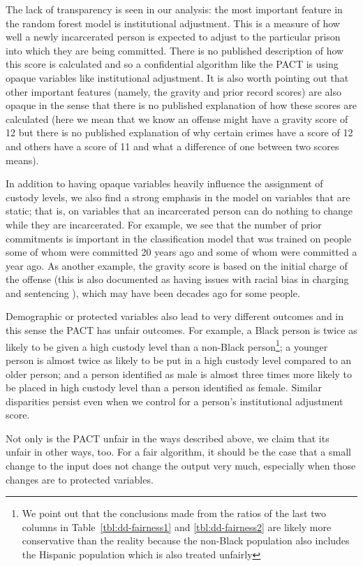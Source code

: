 \documentclass{amsproc}
\numberwithin{equation}{section}
\theoremstyle{plain}
\theoremstyle{remark}
\begin{document}
The lack of transparency is seen in our analysis:  the most important feature in the random forest model is institutional adjustment.  This is a measure of how well a newly incarcerated person is expected to adjust to the particular prison into which they are being committed.  There is no published description of how this score is calculated and so a confidential algorithm like the PACT is using opaque variables like institutional adjustment.  It is also worth pointing out that other important features (namely, the gravity and prior record scores) are also opaque in the sense that there is no published explanation of how these scores are calculated (here we mean that we know an offense might have a gravity score of 12 but there is no published explanation of why certain crimes have a score of 12 and others have a score of 11 and what a difference of one between two scores means).

In addition to having opaque variables heavily influence the assignment of custody levels, we also find a strong emphasis in the model on variables that are static; that is, on variables that an incarcerated person can do nothing to change while they are incarcerated.  For example, we see that the number of prior commitments is important in the classification model that was trained on people some of whom were committed 20 years ago and some of whom were committed a year ago.  As another example, the gravity score is based on the initial charge of the offense (this is also documented as having issues with racial bias in charging and sentencing \cite{vera}), which may have been decades ago for some people.

Demographic or protected variables also lead to very different outcomes and in this sense the PACT has unfair outcomes.  For example, a Black person is twice as likely to be given a high custody level than a non-Black person\footnote{We point out that the conclusions made from the ratios of the last two columns in Table~\ref{tbl:dd-fairness1} and \ref{tbl:dd-fairness2} are likely more conservative than the reality because the non-Black population also includes the Hispanic population which is also treated unfairly}; a younger person is almost twice as likely to be put in a high custody level compared to an older person; and a person identified as male is almost three times more likely to be placed in high custody level than a person identified as female.  Similar disparities persist even when we control for a person's institutional adjustment score.

Not only is the PACT unfair in the ways described above, we claim that its unfair in other ways, too.  For a fair algorithm, it should be the case that a small change to the input does not change the output very much, especially when those changes are to protected variables.  
\end{document}
